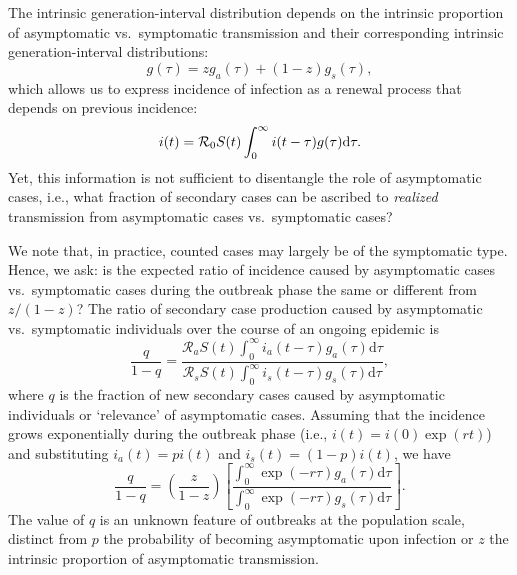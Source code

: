 The intrinsic generation-interval distribution \citep{champredon2015intrinsic} depends on the intrinsic proportion of asymptomatic vs.~symptomatic transmission and their corresponding intrinsic generation-interval distributions:
\begin{equation}
g(\tau) = z g_a(\tau) + (1-z) g_s(\tau),
\end{equation}
which allows us to express incidence of infection as a renewal process that depends on previous incidence:
\begin{equation}
i(t) = {\cal{R}}_{0} S(t) \int_0^\infty i(t-\tau) g(\tau) \mathrm{d} \tau.
\end{equation}
Yet, this information is not sufficient to disentangle the role of asymptomatic cases, i.e., what fraction of secondary cases can be ascribed to \emph{realized} transmission from asymptomatic cases vs.~symptomatic cases?

We note that, in practice, counted cases may largely be of the symptomatic type.
Hence, we ask: is the expected ratio of incidence caused by asymptomatic cases vs.~symptomatic cases during the outbreak phase the same or different from $z/(1-z)$?
The ratio of secondary case production caused by asymptomatic vs.~symptomatic individuals over the course of an ongoing epidemic is
\begin{equation}
\frac{q}{1-q}=\frac{\mathcal R_a S(t) \int_0^\infty i_a(t-\tau) g_a(\tau) \mathrm{d}\tau}{\mathcal R_s S(t) \int_0^\infty i_s(t-\tau) g_s(\tau) \mathrm{d}\tau},
\end{equation}
where $q$ is the fraction of new secondary cases caused by asymptomatic individuals or `relevance' of asymptomatic cases.
Assuming that the incidence grows exponentially during the outbreak phase (i.e., $i(t) = i(0) \exp(r t)$) and substituting $i_a(t) = p i(t)$ and $i_s(t) = (1-p) i(t)$, we have
\begin{equation}
\frac{q}{1-q}=\left(\frac{z}{1-z}\right)\left[\frac{\int_0^\infty \exp(-r\tau) g_a(\tau) \mathrm{d}\tau}{\int_0^\infty \exp(-r\tau) g_s(\tau) \mathrm{d}\tau}\right].
\label{eq.qratio}
\end{equation}
The value of $q$ is an unknown feature of outbreaks at the population scale, distinct from $p$ the probability of becoming asymptomatic upon infection or $z$ the intrinsic proportion of asymptomatic transmission.

